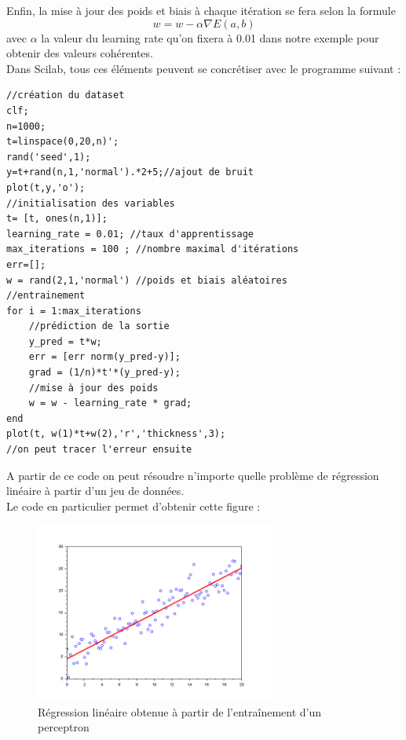     Enfin, la mise à jour des poids et biais à chaque itération se fera selon la formule 
    $$
    w = w - \alpha \nabla E(a,b)
    $$
    avec $\alpha$ la valeur du learning rate qu'on fixera à 0.01 dans notre exemple pour obtenir des valeurs cohérentes.\\
    Dans Scilab, tous ces éléments peuvent se concrétiser avec le programme suivant :
    \begin{center}
          \begin{verbatim}
//création du dataset
clf;
n=1000;
t=linspace(0,20,n)';
rand('seed',1);
y=t+rand(n,1,'normal').*2+5;//ajout de bruit
plot(t,y,'o');
//initialisation des variables
t= [t, ones(n,1)];
learning_rate = 0.01; //taux d'apprentissage
max_iterations = 100 ; //nombre maximal d'itérations
err=[];
w = rand(2,1,'normal') //poids et biais aléatoires
//entrainement
for i = 1:max_iterations
    //prédiction de la sortie
    y_pred = t*w;
    err = [err norm(y_pred-y)];
    grad = (1/n)*t'*(y_pred-y);
    //mise à jour des poids
    w = w - learning_rate * grad;
end
plot(t, w(1)*t+w(2),'r','thickness',3);
//on peut tracer l'erreur ensuite
          \end{verbatim}
                \label{lst:code_16}
         \end{center}
         A partir de ce code on peut résoudre n'importe quelle problème de régression linéaire à partir d'un jeu de données.
         \\Le code en particulier permet d'obtenir cette figure : 
         \begin{figure}[H]
              \centering
                \includegraphics[width=0.7\textwidth]{images/perceptron_lineaire.png}
              \caption{Régression linéaire obtenue à partir de l'entraînement d'un perceptron}
              \label{fig:rn2}
            \end{figure}
